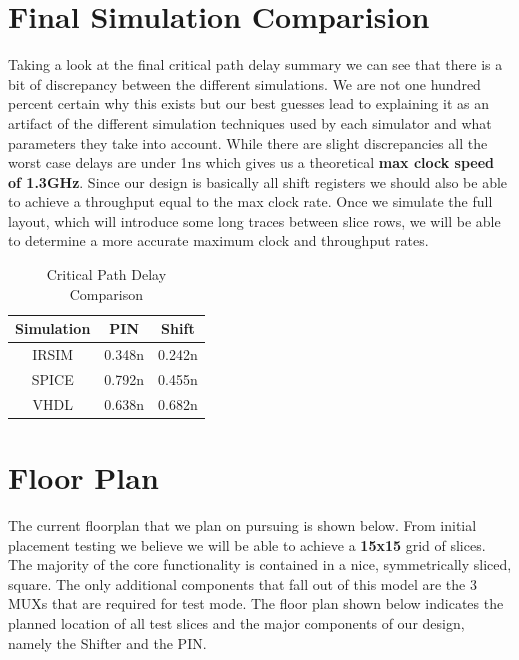 \newpage
\section{Final Simulation Comparision}

    Taking a look at the final critical path delay summary we can see that
    there is a bit of discrepancy between the different simulations. We are not
    one hundred percent certain why this exists but our best guesses lead to
    explaining it as an artifact of the different simulation techniques used by
    each simulator and what parameters they take into account. While there are
    slight discrepancies all the worst case delays are under 1ns which gives us
    a theoretical \textbf{max clock speed of 1.3GHz}. Since our design is
    basically all shift registers we should also be able to achieve a
    throughput equal to the max clock rate. Once we simulate the full layout,
    which will introduce some long traces between slice rows, we will be able
    to determine a more accurate maximum clock and throughput rates.

    \vspace{\baselineskip}

    \begin{table}[H]
        \centering
        \begin{tabular}{ccc}
            \toprule
            \textbf{Simulation} & \textbf{PIN} & \textbf{Shift} \\
            \midrule
            IRSIM & 0.348n & 0.242n \\
            SPICE & 0.792n & 0.455n \\
            VHDL  & 0.638n & 0.682n \\
            \bottomrule
        \end{tabular}
        \caption{Critical Path Delay Comparison}
    \end{table}

\newpage
\section{Floor Plan}

    The current floorplan that we plan on pursuing is shown below. From initial
    placement testing we believe we will be able to achieve a \textbf{15x15}
    grid of slices. The majority of the core functionality is contained in a
    nice, symmetrically sliced, square. The only additional components that
    fall out of this model are the 3 MUXs that are required for test mode. The
    floor plan shown below indicates the planned location of all test slices
    and the major components of our design, namely the Shifter and the PIN.

